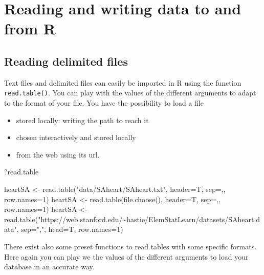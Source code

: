 \documentclass[
  letterpaper,
  DIV=11,
  numbers=noendperiod]{scrreprt}
\newenvironment{Shaded}{\begin{snugshade}}{\end{snugshade}}
\newcommand{\AttributeTok}[1]{\textcolor[rgb]{0.40,0.45,0.13}{#1}}
\newcommand{\DecValTok}[1]{\textcolor[rgb]{0.68,0.00,0.00}{#1}}
\newcommand{\FunctionTok}[1]{\textcolor[rgb]{0.28,0.35,0.67}{#1}}
\newcommand{\NormalTok}[1]{\textcolor[rgb]{0.00,0.23,0.31}{#1}}
\newcommand{\OtherTok}[1]{\textcolor[rgb]{0.00,0.23,0.31}{#1}}
\newcommand{\StringTok}[1]{\textcolor[rgb]{0.13,0.47,0.30}{#1}}
\providecommand{\tightlist}{%
  \setlength{\itemsep}{0pt}\setlength{\parskip}{0pt}}\usepackage{longtable,booktabs,array}
\begin{document}
\chapter{Reading and writing data to and from
R}\label{sec-reading-and-writing-data-to-and-from-r}

\section{Reading delimited files}\label{reading-delimited-files}

Text files and delimited files can easily be imported in R using the
function \texttt{read.table()}. You can play with the values of the
different arguments to adapt to the format of your file. You have the
possibility to load a file

\begin{itemize}
\tightlist
\item
  stored locally: writing the path to reach it
\item
  chosen interactively and stored locally
\item
  from the web using its url.
\end{itemize}

\begin{Shaded}
\begin{Highlighting}[]
\NormalTok{?read.table}

\NormalTok{heartSA }\OtherTok{\textless{}{-}} \FunctionTok{read.table}\NormalTok{(}\StringTok{"data/SAheart/SAheart.txt"}\NormalTok{, }\AttributeTok{header=}\NormalTok{T, }\AttributeTok{sep=}\StringTok{\textquotesingle{},\textquotesingle{}}\NormalTok{, }\AttributeTok{row.names=}\DecValTok{1}\NormalTok{)}
\NormalTok{heartSA }\OtherTok{\textless{}{-}} \FunctionTok{read.table}\NormalTok{(}\FunctionTok{file.choose}\NormalTok{(), }\AttributeTok{header=}\NormalTok{T, }\AttributeTok{sep=}\StringTok{\textquotesingle{},\textquotesingle{}}\NormalTok{, }\AttributeTok{row.names=}\DecValTok{1}\NormalTok{)}
\NormalTok{heartSA }\OtherTok{\textless{}{-}} \FunctionTok{read.table}\NormalTok{(}\StringTok{"https://web.stanford.edu/\textasciitilde{}hastie/ElemStatLearn/datasets/SAheart.data"}\NormalTok{, }
                      \AttributeTok{sep=}\StringTok{","}\NormalTok{, }\AttributeTok{head=}\NormalTok{T, }\AttributeTok{row.names=}\DecValTok{1}\NormalTok{)}
\end{Highlighting}
\end{Shaded}

There exist also some preset functions to read tables with some specific
formats. Here again you can play we the values of the different
arguments to load your database in an accurate way.
\end{document}
